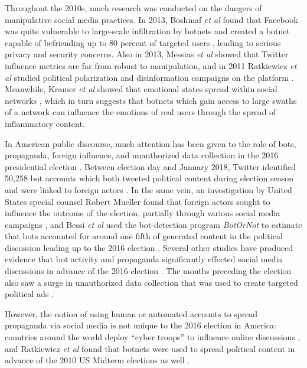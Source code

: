 \documentclass[sigconf,authordraft]{acmart}
\newcommand{\etal}{{\itshape et al }}
\begin{document}
Throughout the 2010s, much research was conducted on the dangers of manipulative social media practices. In 2013, Boshmaf \etal found that Facebook was quite vulnerable to large-scale infiltration by botnets and created a botnet capable of befriending up to 80 percent of targeted users \cite{boshmaf2013design}, leading to serious privacy and security concerns. Also in 2013, Messias \etal showed that Twitter influence metrics are far from robust to manipulation\cite{messias2013you}, and in 2011 Ratkiewicz \etal studied political polarization and disinformation campaigns on the platform \cite{ratkiewicz2011detecting,conover2011political}. Meanwhile, Kramer \etal showed that emotional states spread within social networks \cite{kramer2014experimental}, which in turn suggests that botnets which gain access to large swaths of a network can influence the emotions of real users through the spread of inflammatory content. 


In American public discourse, much attention has been given to the role of bots, propaganda, foreign influence, and unauthorized data collection in the 2016 presidential election \cite{Quartz_twitterbotstory, CambridgeAnalyticaNYT, NYT_opinion_chatbot}. Between election day and January 2018, Twitter identified 50,258 bot accounts which both tweeted political content during election season and were linked to foreign actors \cite{Twitter2016BotReport}. In the same vein, an investigation by United States special counsel Robert Mueller found that foreign actors sought to influence the outcome of the election, partially through various social media campaigns \cite{mueller2019report}, and Bessi \etal used the bot-detection program {\itshape BotOrNot} \cite{davis2016botornot} to estimate that bots accounted for around one fifth of generated content in the political discussion leading up to the 2016 election \cite{bessi2016social}. Several other studies have  produced evidence that bot activity and propaganda significantly effected social media discussions in advance of the 2016 election \cite{howard2017junk, badawy2018analyzing, woolley2017computational, shao2018spread}. The months preceding the election also saw a surge in unauthorized data collection that was used to create targeted political ads \cite{CambridgeAnalyticaNYT}.

However, the notion of using human or automated accounts to spread propaganda via social media is not unique to the 2016 election in America: countries around the world deploy ``cyber troops'' to influence online discussions \cite{bradshaw2017troops}, and Ratkiewicz \etal found that botnets were used to spread political content in advance of the 2010 US Midterm elections as well \cite{ratkiewicz2011truthy}.
\end{document}
